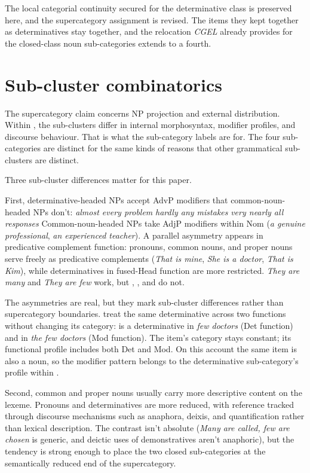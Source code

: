 \documentclass[12pt]{article}
\begin{document}
The local categorial continuity \textcite{payne2010} secured for the determinative class is preserved here, and the supercategory assignment is revised. The items they kept together as determinatives stay together, and the relocation \textit{CGEL} already provides for the closed-class noun sub-categories extends to a fourth.

\section{Sub-cluster combinatorics}\label{sec:subcluster}

The supercategory claim concerns NP projection and external distribution. Within , the sub-clusters differ in internal morphosyntax, modifier profiles, and discourse behaviour. That is what the sub-category labels are for. The four sub-categories are distinct for the same kinds of reasons that other grammatical sub-clusters are distinct.

Three sub-cluster differences matter for this paper.

First, determinative-headed NPs accept AdvP modifiers that common-noun-headed NPs don't:
\ea\label{ex:advp-det}
\ea \textit{almost every problem}
\ex \textit{hardly any mistakes}
\ex \textit{very nearly all responses}
\z
\z
Common-noun-headed NPs take AdjP modifiers within Nom (\textit{a genuine professional}, \textit{an experienced teacher}). A parallel asymmetry appears in predicative complement function: pronouns, common nouns, and proper nouns serve freely as predicative complements (\textit{That is mine}, \textit{She is a doctor}, \textit{That is Kim}), while determinatives in fused-Head function are more restricted. \textit{They are many} and \textit{They are few} work, but , , and  do not.

The asymmetries are real, but they mark sub-cluster differences rather than supercategory boundaries. \textcite[13--14]{payne2010} treat the same determinative across two functions without changing its category:  is a determinative in \textit{few doctors} (Det function) and in \textit{the few doctors} (Mod function). The item's category stays constant; its functional profile includes both Det and Mod. On this account the same item is also a noun, so the modifier pattern belongs to the determinative sub-category's profile within .

Second, common and proper nouns usually carry more descriptive content on the lexeme. Pronouns and determinatives are more reduced, with reference tracked through discourse mechanisms such as anaphora, deixis, and quantification rather than lexical description. The contrast isn't absolute (\textit{Many are called, few are chosen} is generic, and deictic uses of demonstratives aren't anaphoric), but the tendency is strong enough to place the two closed sub-categories at the semantically reduced end of the supercategory.
\end{document}
